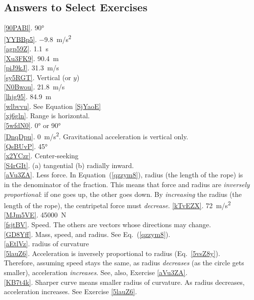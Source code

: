 \documentclass[main-physics.tex]{subfiles}
\begin{document}
\subsection{Answers to Select Exercises}
\ref{90PABl}. \ang{90}\\
\ref{YYBBp5}. \SI{-9.8}{m/s^2}\\
\ref{agp59Z}. \SI{1.1}{s}\\
\ref{Xu3FK9}. \SI{90.4}{m}\\
\ref{piJ9kJ}. \SI{31.3}{m/s}\\
\ref{sy5RGT}. Vertical (or $y$)\\
\ref{N0Bwou}. \SI{21.8}{m/s}\\
\ref{lhjg95}. \SI{84.9}{m}\\
\ref{wlbvvu}. See Equation \eqref{SjYaoE}\\
\ref{xj6gln}. Range is horizontal.\\
\ref{5wfdN0}. \ang{0} or \ang{90}\\
\ref{DnqDpu}. \SI{0}{m/s^2}. Gravitational acceleration is vertical only.\\
\ref{QsBUvP}. \ang{45}\\
\ref{x2YCzr}. Center-seeking\\
\ref{S4rGIt}. (a) tangential \hspace{1em} (b) radially inward.\\
\ref{aVu3ZA}. Less force. In Equation~(\ref{qzzym8}), radius (the length of the rope) is in the denominator of the fraction. This means that force and radius are \textit{inversely proportional}: if one goes up, the other goes down. By \textit{increasing} the radius (the length of the rope), the centripetal force must \textit{decrease}.
\ref{kTvEZX}. \SI{72}{m/s^2}\\
\ref{MJm5VE}. \SI{45000}{N}\\
\ref{fsjtBV}. Speed. The others are vectors whose directions may change.\\
\ref{GD8Yff}. Mass, speed, and radius. See Eq.~(\ref{qzzym8}).\\
\ref{aEtlVz}. radius of curvature\\
\ref{5lauZ6}. Acceleration is inversely proportional to radius (Eq.~\ref{5vsZ8y}). Therefore, assuming speed stays the same, as radius \textit{decreases} (as the circle gets smaller), acceleration \textit{increases}. See, also, Exercise \ref{aVu3ZA}.\\
\ref{KB7t4k}. Sharper curve means smaller radius of curvature. As radius decreases, acceleration increases. See Exercise \ref{5lauZ6}.\\
\end{document}
